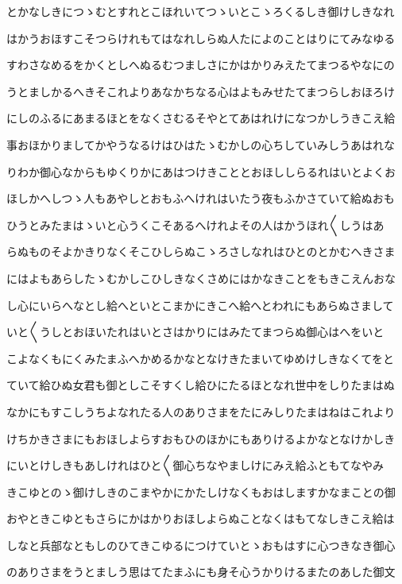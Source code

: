 \documentclass[a4paper,11pt,landscape]{ltjtarticle}
\begin{document}
とかなしきにつゝむとすれとこほれいてつゝいとこゝろくるしき御けしきなれ
\par\medskip
はかうおほすこそつらけれもてはなれしらぬ人たによのことはりにてみなゆる
\par\medskip
すわさなめるをかくとしへぬるむつましさにかはかりみえたてまつるやなにの
\par\medskip
うとましかるへきそこれよりあなかちなる心はよもみせたてまつらしおほろけ
\par\medskip
にしのふるにあまるほとをなくさむるそやとてあはれけになつかしうきこえ給
\par\medskip
事おほかりましてかやうなるけはひはたゝむかしの心ちしていみしうあはれな
\par\medskip
りわか御心なからもゆくりかにあはつけきこととおほししらるれはいとよくお
\par\medskip
ほしかへしつゝ人もあやしとおもふへけれはいたう夜もふかさていて給ぬおも
\par\medskip
ひうとみたまはゝいと心うくこそあるへけれよその人はかうほれ〱しうはあ
\par\medskip
らぬものそよかきりなくそこひしらぬこゝろさしなれはひとのとかむへきさま
\par\medskip
にはよもあらしたゝむかしこひしきなくさめにはかなきことをもきこえんおな
\par\medskip
し心にいらへなとし給へといとこまかにきこへ給へとわれにもあらぬさまして
\par\medskip
いと〱うしとおほいたれはいとさはかりにはみたてまつらぬ御心はへをいと
\par\medskip
こよなくもにくみたまふへかめるかなとなけきたまいてゆめけしきなくてをと
\par\medskip
ていて給ひぬ女君も御としこそすくし給ひにたるほとなれ世中をしりたまはぬ
\par\medskip
なかにもすこしうちよなれたる人のありさまをたにみしりたまはねはこれより
\par\medskip
けちかきさまにもおほしよらすおもひのほかにもありけるよかなとなけかしき
\par\medskip
にいとけしきもあしけれはひと〱御心ちなやましけにみえ給ふともてなやみ
\par\medskip
きこゆとのゝ御けしきのこまやかにかたしけなくもおはしますかなまことの御
\par\medskip
おやときこゆともさらにかはかりおほしよらぬことなくはもてなしきこえ給は
\par\medskip
しなと兵部なともしのひてきこゆるにつけていとゝおもはすに心つきなき御心
\par\medskip
のありさまをうとましう思はてたまふにも身そ心うかりけるまたのあした御文
\end{document}
